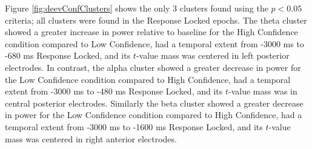 \documentclass[11pt, titlepage, twoside]{article}
\begin{document}
Figure \ref{fig:deevConfClusters} shows the only 3 clusters found using the $p<0.05$ criteria; all clusters were found in the Response Locked epochs.  The theta cluster showed a greater increase in power relative to baseline for the High Confidence condition compared to Low Confidence, had a temporal extent from -3000 ms to -680 ms Response Locked, and its $t$-value mass was centered in left posterior electrodes.  In contrast, the alpha cluster showed a greater decrease in power for the Low Confidence condition compared to High Confidence, had a temporal extent from -3000 ms  to -480 ms Response Locked, and its $t$-value mass was in central posterior electrodes.  Similarly the beta cluster showed a greater decrease in power for the Low Confidence condition compared to High Confidence, had a temporal extent from -3000 ms to -1600 ms Response Locked, and its $t$-value mass was centered in right anterior electrodes.
\end{document}
